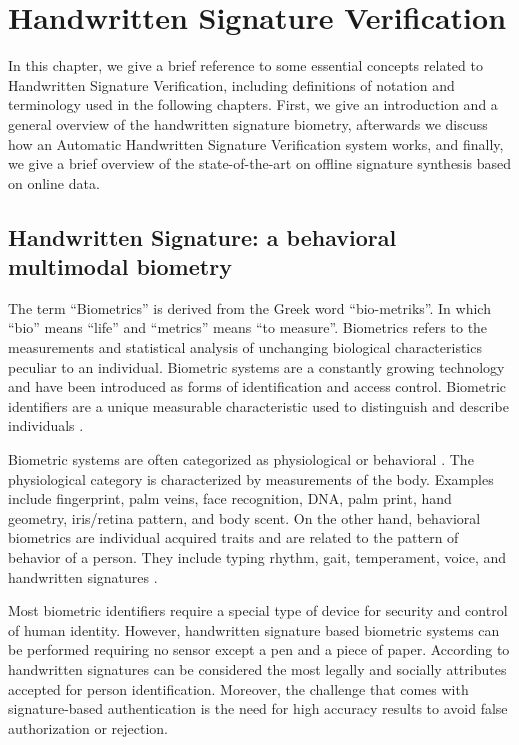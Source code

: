 
\chapter{Handwritten Signature Verification} \label{ch:sig}
In this chapter, we give a brief reference to some essential concepts related to Handwritten Signature Verification, including definitions of notation and terminology used in the following
chapters. First, we give an introduction and a general overview of the handwritten signature
biometry, afterwards we discuss how an Automatic Handwritten Signature Verification system
works, and finally, we give a brief overview of the state-of-the-art on offline signature synthesis
based on online data.

\section{Handwritten Signature: a behavioral multimodal biometry}

The term ``Biometrics'' is derived from the Greek word ``bio-metriks''. In which ``bio'' means ``life'' and ``metrics'' means ``to measure''. Biometrics refers to the measurements and statistical analysis of unchanging biological characteristics peculiar to an individual. Biometric systems are
a constantly growing technology \cite{jain2004biometrics} and have been introduced as forms of identification and access control. Biometric identifiers are a unique measurable characteristic used to distinguish and describe individuals \cite{jain2000biometric}. 

Biometric systems are often categorized as physiological or behavioral \cite{ross2008introduction}. The physiological category is characterized by measurements of the body. Examples include fingerprint, palm veins, face recognition, DNA, palm print, hand geometry, iris/retina pattern, and body scent. On the other hand, behavioral biometrics are individual acquired traits and are related to the pattern of behavior of a person. They include typing rhythm, gait, temperament, voice, and handwritten signatures \cite{jain2016}.

Most biometric identifiers require a special type of device for security and control of human identity. However, handwritten signature based biometric systems can be performed requiring no sensor except a pen and a piece of paper. According to \cite{pal2014signature} handwritten signatures can be considered the most legally and socially attributes accepted for person identification. Moreover, the challenge that comes with signature-based authentication is the need for high accuracy results to avoid false authorization or rejection.


